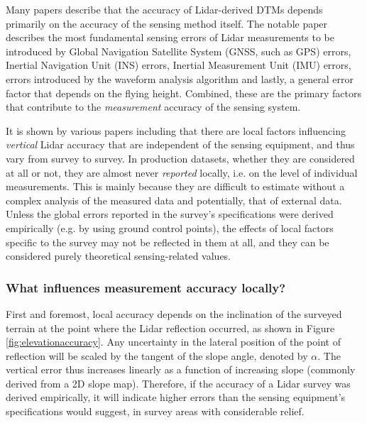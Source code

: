 Many papers describe that the accuracy of Lidar-derived DTMs depends primarily on the accuracy of the sensing method itself. The notable paper \cite{hodgson_breshanan_2004} describes the most fundamental sensing errors of Lidar measurements to be introduced by Global Navigation Satellite System (GNSS, such as GPS) errors, Inertial Navigation Unit (INS) errors, Inertial Measurement Unit (IMU) errors, errors introduced by the waveform analysis algorithm and lastly, a general error factor that depends on the flying height. Combined, these are the primary factors that contribute to the \textit{measurement} accuracy of the sensing system.

It is shown by various papers including \cite{hodgson_breshanan_2004, su_bork_2006, kraus_etal_2006, raber_etal_2007, peng_shih_2006, chow_hodgson_2009, aguilar_etal_2005, aguilar_etal_2010, guo_etal_2010} that there are local factors influencing \textit{vertical} Lidar accuracy that are independent of the sensing equipment, and thus vary from survey to survey. In production datasets, whether they are considered at all or not, they are almost never \textit{reported} locally, i.e. on the level of individual measurements. This is mainly because they are difficult to estimate without a complex analysis of the measured data and potentially, that of external data. Unless the global errors reported in the survey's specifications were derived empirically (e.g. by using ground control points), the effects of local factors specific to the survey may not be reflected in them at all, and they can be considered purely theoretical sensing-related values.

\subsubsection{What influences measurement accuracy locally?}

First and foremost, local accuracy depends on the inclination of the surveyed terrain at the point where the Lidar reflection occurred, as shown in Figure \ref{fig:elevationaccuracy}. Any uncertainty in the lateral position of the point of reflection will be scaled by the tangent of the slope angle, denoted by $\alpha$. The vertical error thus increases linearly as a function of increasing slope (commonly derived from a 2D slope map). Therefore, if the accuracy of a Lidar survey was derived empirically, it will indicate higher errors than the sensing equipment's specifications would suggest, in survey areas with considerable relief.

